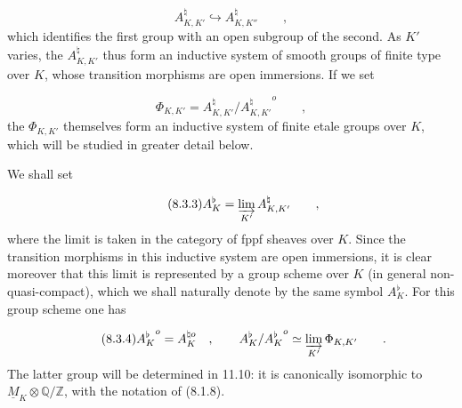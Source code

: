 \begin{equation}\tag{8.3.1}
A^{\natural}_{K,K'} \hookrightarrow A^{\natural}_{K,K''}
 \qquad ,
\end{equation}
which identifies the first group with an open subgroup of the
second. As $K'$ varies, the $A^{\natural}_{K,K'}$ thus form an
inductive system of smooth groups of finite type over $K$, whose
transition morphisms are open immersions. If we set

\begin{equation}\tag{8.3.2}
\Phi_{K,K'}=A^{\natural}_{K,K'}
 /{A^{\natural}_{K,K'}}^{o} \qquad ,
\end{equation}
the $\Phi_{K,K'}$ themselves form an inductive system of finite
etale groups over $K$, which will be studied in greater detail
below.

We shall set

\begin{equation}\tag{8.3.3}
A^{\flat}_{K}=\varinjlim_{K'} A^{\natural}_{K,K'} \qquad ,
\end{equation}
where the limit is taken in the category of fppf sheaves over $K$.
Since the transition morphisms in this inductive system are open
immersions, it is clear moreover that this limit is represented by
a group scheme over $K$ (in general non-quasi-compact), which we
shall naturally denote by the same symbol $A^{\flat}_{K}$. For this
group scheme one has

\begin{equation}\tag{8.3.4}
{A_{K}^{\flat}}^{o}=A_{K}^{\natural o} \quad , \qquad
A^{\flat}_{K}/{A_{K}^{\flat}}^{o}
 \simeq \varinjlim_{K'}\Phi_{K,K'} \qquad .
\end{equation}
The latter group will be determined in 11.10: it is canonically
isomorphic to $\underline{M}_{K}\otimes\mathbb{Q}/\mathbb{Z}$, with
the notation of (8.1.8).
